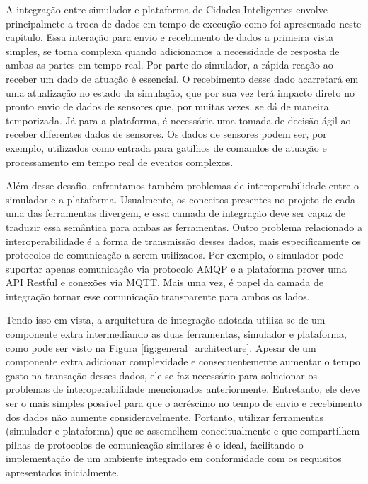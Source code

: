 A integração entre simulador e plataforma de Cidades Inteligentes envolve principalmete a troca de dados em tempo de execução como foi apresentado neste capítulo.
Essa interação para envio e recebimento de dados a primeira vista simples, se torna complexa quando adicionamos a necessidade de resposta de ambas as partes em tempo real.
Por parte do simulador, a rápida reação ao receber um dado de atuação é essencial.
O recebimento desse dado acarretará em uma atualização no estado da simulação, que por sua vez terá impacto direto no pronto envio de dados de sensores que, por muitas vezes,
se dá de maneira temporizada.
Já para a plataforma, é necessária uma tomada de decisão ágil ao receber diferentes dados de sensores.
Os dados de sensores podem ser, por exemplo, utilizados como entrada para gatilhos de comandos de atuação e processamento em tempo real de eventos complexos.

Além desse desafio, enfrentamos também problemas de interoperabilidade entre o simulador e a plataforma.
Usualmente, os conceitos presentes no projeto de cada uma das ferramentas divergem, e essa camada de integração deve ser capaz de traduzir essa semântica para ambas as ferramentas.
Outro problema relacionado a interoperabilidade é a forma de transmissão desses dados, mais especificamente os protocolos de comunicação a serem utilizados.
Por exemplo, o simulador pode suportar apenas comunicação via protocolo AMQP e a plataforma prover uma API Restful e conexões via MQTT.
Mais uma vez, é papel da camada de integração tornar esse comunicação transparente para ambos os lados.

Tendo isso em vista, a arquitetura de integração adotada utiliza-se de um componente extra intermediando as duas ferramentas, simulador e plataforma, como pode ser visto na
Figura \ref{fig:general_architecture}.
Apesar de um componente extra adicionar complexidade e consequentemente aumentar o tempo gasto na transação desses dados, ele se faz necessário para solucionar os problemas
de interoperabilidade mencionados anteriormente.
Entretanto, ele deve ser o mais simples possível para que o acréscimo no tempo de envio e recebimento dos dados não aumente consideravelmente.
Portanto, utilizar ferramentas (simulador e plataforma) que se assemelhem conceitualmente e que compartilhem pilhas de protocolos de comunicação similares é o ideal,
facilitando o implementação de um ambiente integrado em conformidade com os requisitos apresentados inicialmente.

